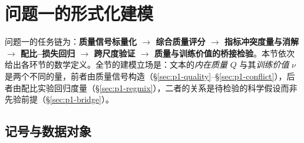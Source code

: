 
\section{问题一的形式化建模}\label{sec:p1-model}

问题一的任务链为：\textbf{质量信号标量化 $\to$ 综合质量评分 $\to$ 指标冲突度量与消解 $\to$ 配比--损失回归 $\to$ 跨尺度验证 $\to$ 质量与训练价值的桥接检验}。本节依次给出各环节的数学定义。全节的建模立场是：文本的\emph{内在质量} $Q$ 与其\emph{训练价值} $\nu$ 是两个不同的量，前者由质量信号构造（\S\ref{sec:p1-quality}--\S\ref{sec:p1-conflict}），后者由配比实验回归度量（\S\ref{sec:p1-regmix}），二者的关系是待检验的科学假设而非先验前提（\S\ref{sec:p1-bridge}）。

\subsection{记号与数据对象}\label{sec:p1-notation}

